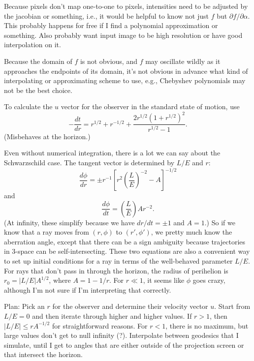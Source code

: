 \documentclass{article}
\begin{document}
Because pixels don't map one-to-one to pixels, intensities need to be
adjusted by the jacobian or something, i.e., it would be helpful to
know not just $f$ but $\partial f/\partial\alpha$. This probably happens for
free if I find a polynomial approximation or something. Also probably want
input image to be high resolution or have good interpolation on it.

Because the domain of $f$ is not obvious, and $f$ may oscillate wildly as it
approaches the endpoints of its domain, it's not obvious in advance what
kind of interpolating or approximating scheme to use, e.g., Chebyshev polynomials
may not be the best choice.

To calculate the $u$ vector for the observer in the standard state of motion, use
\begin{equation*}
  -\frac{dt}{dr} = r^{1/2}+r^{-1/2}+\frac{2r^{1/2}(1+r^{1/2})^2}{r^{1/2}-1}.
\end{equation*}
(Misbehaves at the horizon.)

Even without numerical integration, there is a lot we can say about the Schwarzschild case.
The tangent vector is determined by $L/E$ and $r$:
\begin{equation*}
  \frac{d\phi}{dr} = \pm r^{-1}\left[r^2\left(\frac{L}{E}\right)^{-2}-A\right]^{-1/2}
\end{equation*}
and
\begin{equation*}
  \frac{d\phi}{dt} = \left(\frac{L}{E}\right)Ar^{-2}.
\end{equation*}
(At infinity, these simplify because we have $dr/dt=\pm 1$ and $A=1$.) So if we know that a ray
moves from $(r,\phi)$ to $(r',\phi')$, we pretty much know the aberration angle, except that there
can be a sign ambiguity because trajectories in 3-space can be self-intersecting.
These two equations are also a convenient way to set up initial conditions for a ray in terms
of the well-behaved parameter $L/E$.
For rays that don't pass in through the horizon, the radius of perihelion is $r_0=|L/E|A^{1/2}$, where
$A=1-1/r$. For $r \ll 1$, it seems like $\phi$ goes crazy, although I'm not sure if I'm interpreting that
correctly.

Plan: Pick an $r$ for the observer and determine their velocity vector $u$.
Start from $L/E=0$ and then iterate through higher and higher values.
If $r>1$, then $|L/E| \le rA^{-1/2}$ for
straightforward reasons. For $r<1$, there is no maximum, but large values don't
get to null infinity (?).
Interpolate between geodesics that I simulate, until I get to angles that are
either outside of the projection screen or that intersect the horizon.
\end{document}
